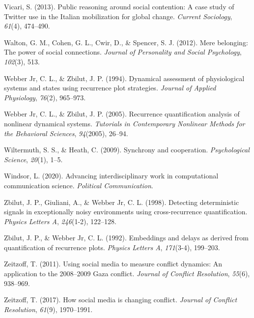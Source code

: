 \documentclass[english,man]{apa6}
\begin{document}
\leavevmode\hypertarget{ref-vicari2013public}{}%
Vicari, S. (2013). Public reasoning around social contention: A case study of Twitter use in the Italian mobilization for global change. \emph{Current Sociology}, \emph{61}(4), 474--490.

\leavevmode\hypertarget{ref-walton2012mere}{}%
Walton, G. M., Cohen, G. L., Cwir, D., \& Spencer, S. J. (2012). Mere belonging: The power of social connections. \emph{Journal of Personality and Social Psychology}, \emph{102}(3), 513.

\leavevmode\hypertarget{ref-webber1994dynamical}{}%
Webber Jr, C. L., \& Zbilut, J. P. (1994). Dynamical assessment of physiological systems and states using recurrence plot strategies. \emph{Journal of Applied Physiology}, \emph{76}(2), 965--973.

\leavevmode\hypertarget{ref-webber2005recurrence}{}%
Webber Jr, C. L., \& Zbilut, J. P. (2005). Recurrence quantification analysis of nonlinear dynamical systems. \emph{Tutorials in Contemporary Nonlinear Methods for the Behavioral Sciences}, \emph{94}(2005), 26--94.

\leavevmode\hypertarget{ref-wiltermuth2009synchrony}{}%
Wiltermuth, S. S., \& Heath, C. (2009). Synchrony and cooperation. \emph{Psychological Science}, \emph{20}(1), 1--5.

\leavevmode\hypertarget{ref-Windsor2020}{}%
Windsor, L. (2020). Advancing interdisciplinary work in computational communication science. \emph{Political Communication}.

\leavevmode\hypertarget{ref-zbilut1998detecting}{}%
Zbilut, J. P., Giuliani, A., \& Webber Jr, C. L. (1998). Detecting deterministic signals in exceptionally noisy environments using cross-recurrence quantification. \emph{Physics Letters A}, \emph{246}(1-2), 122--128.

\leavevmode\hypertarget{ref-zbilut1992embeddings}{}%
Zbilut, J. P., \& Webber Jr, C. L. (1992). Embeddings and delays as derived from quantification of recurrence plots. \emph{Physics Letters A}, \emph{171}(3-4), 199--203.

\leavevmode\hypertarget{ref-zeitzoff2011using}{}%
Zeitzoff, T. (2011). Using social media to measure conflict dynamics: An application to the 2008--2009 Gaza conflict. \emph{Journal of Conflict Resolution}, \emph{55}(6), 938--969.

\leavevmode\hypertarget{ref-zeitzoff2017social}{}%
Zeitzoff, T. (2017). How social media is changing conflict. \emph{Journal of Conflict Resolution}, \emph{61}(9), 1970--1991.

\endgroup
\end{document}
